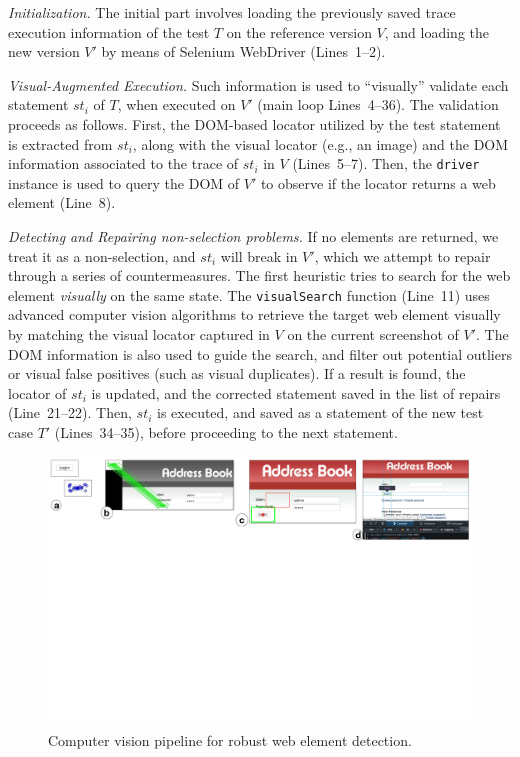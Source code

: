 \textit{Initialization.} 
The initial part involves loading the previously saved trace execution information of the test $T$ on the reference version $V$, and loading the new version $V'$ by means of Selenium WebDriver (Lines~1--2). 

\textit{Visual-Augmented Execution.}
Such information is used to ``visually'' validate each statement $st_i$ of $T$, when executed on $V'$ (main loop Lines~4--36). The validation proceeds as follows. First, the DOM-based locator utilized by the test statement is extracted from $st_i$, along with the visual locator (e.g., an image) and the DOM information associated to the trace of $st_i$ in $V$  (Lines~5--7). Then, the \texttt{driver} instance is used to query the DOM of $V'$ to observe if the locator returns a web element (Line~8). 



\textit{Detecting and Repairing non-selection problems.}
If no elements are returned, we treat it as a non-selection, and $st_i$ will break in $V'$, which we attempt to repair through a series of countermeasures. The first heuristic tries to search for the web element \textit{visually} on the same state. The \texttt{visualSearch} function (Line~11) uses advanced computer vision algorithms to retrieve the target web element visually by  matching the visual locator captured in $V$ on the current screenshot of $V'$. The DOM information is also used to guide the search, and filter out potential outliers or visual false positives (such as visual duplicates). If a result is found, the locator of $st_i$ is updated, and the corrected statement saved in the list of repairs (Line~21--22). Then, $st_i$ is executed, and saved as a statement of the new test case $T'$ (Lines~34--35), before proceeding to the next statement.

\begin{figure}[t]
\centering
\includegraphics[trim={0.3cm 17cm 0.4cm 0.3cm},clip,scale=0.44]{images/cv}
\caption{Computer vision pipeline for robust web element detection.}
\label{fig:cv}
\end{figure}


